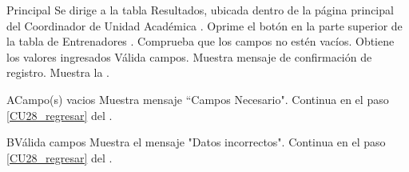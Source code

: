     \begin{UCtrayectoria}{Principal}
    \UCpaso[\UCactor] Se dirige a la tabla Resultados, ubicada dentro de la página principal del Coordinador de Unidad Académica .
    \UCpaso[\UCactor] Oprime el botón  en la parte superior de la tabla de Entrenadores .
    \UCpaso Comprueba que los campos no estén vacíos. 
    \UCpaso Obtiene los valores ingresados
    \UCpaso Válida campos. 
    \UCpaso Muestra mensaje de confirmación de registro.
    \UCpaso Muestra la .
\end{UCtrayectoria}

\begin{UCtrayectoriaA}{A}{Campo(s) vacios}
	\UCpaso Muestra mensaje “Campos Necesario".
	\UCpaso Continua en el paso \ref{CU28_regresar} del .
\end{UCtrayectoriaA}

\begin{UCtrayectoriaA}{B}{Válida campos}
	\UCpaso Muestra el mensaje "Datos incorrectos".
	\UCpaso Continua en el paso \ref{CU28_regresar} del .
\end{UCtrayectoriaA}


	


